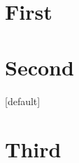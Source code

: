 \documentclass[aspectratio=169]{beamer}
\begin{document}
\section{First}
\section{Second}
\begin{frame}[plain]
  [default]
  \sectionpage
\end{frame}
\section{Third}
\end{document}
